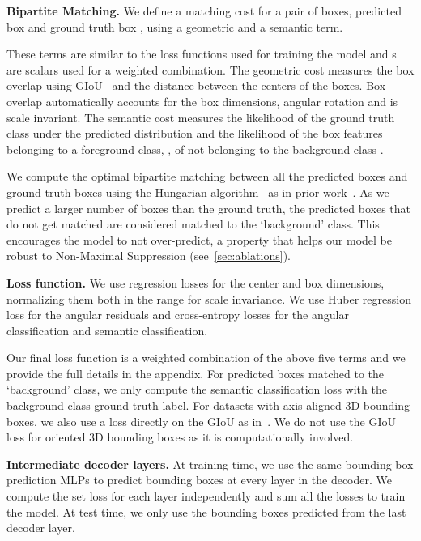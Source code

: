 \documentclass[10pt,twocolumn,letterpaper]{article}
\begin{document}
\par \noindent \textbf{Bipartite Matching.} We define a matching cost for a pair of boxes, predicted box  and ground truth box , using a geometric and a semantic term.




These terms are similar to the loss functions used for training the model and s are scalars used for a weighted combination.
The geometric cost measures the box overlap using GIoU~\cite{Rezatofighi_2018_CVPR} and the distance between the centers of the boxes. Box overlap automatically accounts for the box dimensions, angular rotation and is scale invariant.
The semantic cost measures the likelihood of the ground truth class  under the predicted distribution  and the likelihood of the box features belonging to a foreground class, \ie, of not belonging to the background class .

We compute the optimal bipartite matching between all the predicted boxes  and ground truth boxes  using the Hungarian algorithm~\cite{kuhn1955hungarian} as in prior work~\cite{stewart2016end,carion2020end}.
As we predict a larger number of boxes than the ground truth, the predicted boxes that do not get matched are considered matched to the `background' class.
This encourages the model to not over-predict, a property that helps our model be robust to Non-Maximal Suppression (see~\cref{sec:ablations}).


\par \noindent \textbf{Loss function.} We use  regression losses for the center and box dimensions, normalizing them both in the range  for scale invariance.
We use Huber regression loss for the angular residuals and cross-entropy losses for the angular classification and semantic classification.


Our final loss function is a weighted combination of the above five terms and we provide the full details in the appendix.
For predicted boxes matched to the `background' class, we only compute the semantic classification loss with the background class ground truth label.
For datasets with axis-aligned 3D bounding boxes, we also use a loss directly on the GIoU as in~\cite{carion2020end,Rezatofighi_2018_CVPR}.
We do not use the GIoU loss for oriented 3D bounding boxes as it is computationally involved.
\par \noindent \textbf{Intermediate decoder layers.} At training time, we use the same bounding box prediction MLPs to predict bounding boxes at every layer in the decoder.
We compute the set loss for each layer independently and sum all the losses to train the model.
At test time, we only use the bounding boxes predicted from the last decoder layer.
\end{document}
